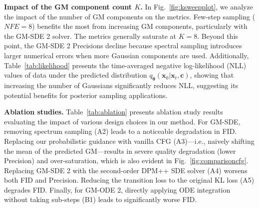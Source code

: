 \documentclass{article}
\def\vtheta{{\bm{\theta}}}
\def\vc{{\bm{c}}}
\def\vx{{\bm{x}}}
\theoremstyle{custom}
\theoremstyle{definition}
\theoremstyle{remark}
\begin{document}
\textbf{Impact of the GM component count $K$.}  
In Fig.~\ref{fig:ksweepplot}, we analyze the impact of the number of GM components on the metrics. Few-step sampling ($\mathit{NFE} = 8$) benefits the most from increasing GM components, particularly with the GM-SDE 2 solver. The metrics generally saturate at $K=8$. Beyond this point, the GM-SDE 2 Precisions decline because spectral sampling introduces larger numerical errors when more Gaussian components are used. Additionally, Table~\ref{tab:likelihood} presents the time-averaged negative log-likelihood (NLL) values of data under the predicted distribution $q_\vtheta(\vx_0|\vx_t, \vc)$, showing that increasing the number of Gaussians significantly reduces NLL, suggesting its potential benefits for posterior sampling applications.
 


\textbf{Ablation studies.}
Table~\ref{tab:ablation} presents ablation study results evaluating the impact of various design choices in our method. For GM-SDE, removing spectrum sampling (A2) leads to a noticeable degradation in FID. Replacing our probabilistic guidance with vanilla CFG (A3)---i.e., naively shifting the mean of the predicted GM---results in severe quality degradation (lower Precision) and over-saturation, which is also evident in Fig.~\ref{fig:comparisoncfg}. Replacing GM-SDE 2 with the second-order DPM++ SDE solver (A4) worsens both FID and Precision. Reducing the transition loss to the original KL loss (A5) degrades FID. Finally, for GM-ODE 2, directly applying ODE integration without taking sub-steps (B1) leads to significantly worse FID.
\end{document}
